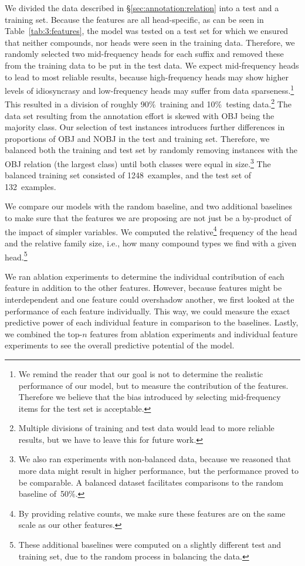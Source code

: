 \documentclass[output=paper]{langsci/langscibook}
\begin{document}
We divided the data described in §\ref{sec:annotation:relation} into a test and a training set. Because the features are all head-specific, as can be seen in Table~\ref{tab:3:features}, the model was tested on a test set for which we ensured that neither compounds, nor heads were seen in the training data. Therefore, we randomly selected two mid-frequency heads for each suffix and removed these from the training data to be put in the test data. We expect mid-frequency heads to lead to most reliable results, because high-frequency heads may show higher levels of idiosyncrasy and low-frequency heads may suffer from data sparseness.\footnote{We remind the reader that our goal is not to determine the realistic performance of our model, but to measure the contribution of the features. Therefore we believe that the bias introduced by selecting mid-frequency items for the test set is acceptable.} This resulted in a division of roughly 90\%~training and 10\%~testing data.\footnote{Multiple divisions of training and test data would lead to more reliable results, but we have to leave this for future work.} 
The data set resulting from the annotation effort is skewed with OBJ being the majority class.
Our selection of test instances introduces further differences in proportions of OBJ and NOBJ in the test and training set.
Therefore, we balanced both the training and test set by randomly removing instances with the OBJ relation (the largest class) until both classes were equal in size.\footnote{We also ran experiments with non-balanced data, because we reasoned that more data might result in higher performance, but the performance proved to be comparable. A balanced dataset facilitates comparisons to the random baseline of~50\%.}  The balanced training set consisted of 1248~examples, and the test set of 132~examples.

We compare our models with the random baseline, and two additional baselines to make sure  that the features we are proposing are not just be a by-product of the impact of simpler variables. We computed the relative\footnote{By providing relative counts, we make sure these features are on the same scale as our other features.}  frequency of the head and the relative family size, i.e., how many compound types we find with a given head.\footnote{These additional baselines were computed on a slightly different test and training set, due to the random process in balancing the data.}

We ran ablation experiments to determine the individual contribution of each feature in addition to the other features. However, because features might be interdependent and one feature could overshadow another, we first looked at the performance of each feature individually.
This way, we could measure the exact predictive power of each individual feature in comparison to the baselines. Lastly, we combined the top-$n$ features from ablation experiments and individual feature experiments to see the overall predictive potential of the model.
\end{document}
